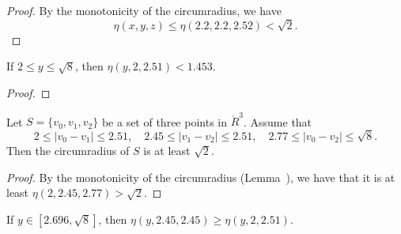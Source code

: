 \begin{tarskidata}
\begin{tarski}
\begin{proof}
By the monotonicity of the circumradius, we have
	$$\eta(x,y,z)\le \eta(2.2,2.2,2.52) < \sqrt2.$$
\end{proof}
\end{tarski}



\begin{tarski}

\begin{lemma}
If $2\le y\le\sqrt8$, then $\eta(y,2,2.51) < 1.453$.
\end{lemma}

\begin{proof}
\end{proof}
\end{tarski}



\begin{tarski}

\begin{lemma}
Let $S=\{v_0,v_1,v_2\}$ be a set of three points in $\ring{R}^3$.
Assume that 
  $$
  2\le|v_0-v_1|\le 2.51,\quad 2.45\le|v_1-v_2|\le 2.51,
  \quad 2.77\le |v_0-v_2|\le \sqrt8.
  $$
Then the circumradius of $S$ is at least $\sqrt2$.
\end{lemma}


\begin{proof}
By the monotonicity of the circumradius (Lemma~), 
we have
that it is at least $\eta(2,2.45,2.77) > \sqrt2$.
\end{proof}
\end{tarski}





\begin{tarski}

\begin{lemma}
If $y\in[2.696,\sqrt8]$, then
$\eta(y,2.45,2.45)\ge\eta(y,2,2.51)$.
\end{lemma}


\end{tarski}
\end{tarskidata}
